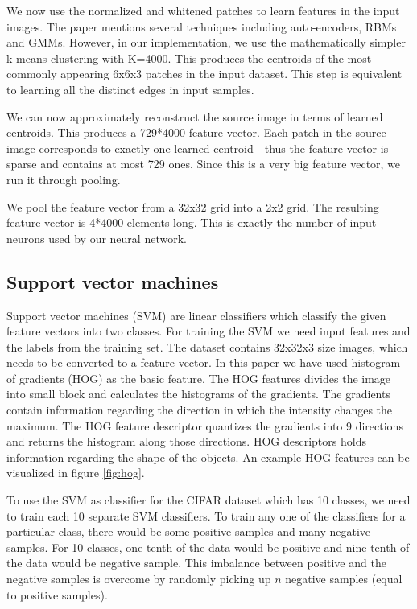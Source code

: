 \documentclass{article} %
\begin{document}
        We now use the normalized and whitened patches to learn features in the input images. The paper \cite{andrew} mentions several techniques including auto-encoders, RBMs and GMMs. However, in our implementation, we use the mathematically simpler k-means clustering with K=4000. This produces the centroids of the most commonly appearing 6x6x3 patches in the input dataset. This step is equivalent to learning all the distinct edges in input samples.

        We can now approximately reconstruct the source image in terms of learned centroids. This produces a 729*4000 feature vector. Each patch in the source image corresponds to exactly one learned centroid - thus the feature vector is sparse and contains at most 729 ones. Since this is a very big feature vector, we run it through pooling.

        We pool the feature vector from a 32x32 grid into a 2x2 grid. The resulting feature vector is 4*4000 elements long. This is exactly the number of input neurons used by our neural network.

\subsection{Support vector machines}
\label{sec:svm}
	Support vector machines (SVM) are linear classifiers which classify the given feature vectors into two classes. For training the SVM we need input features and the labels from the training set. The dataset contains 32x32x3 size images, which needs to be converted to a feature vector. In this paper we have used histogram of gradients (HOG) as the basic feature. The HOG features divides the image into small block and calculates the histograms of the gradients. The gradients contain information regarding the direction in which the intensity changes the maximum. The HOG feature descriptor quantizes the gradients into 9 directions and returns the histogram along those directions. HOG descriptors holds information regarding the shape of the objects. An example HOG features can be visualized in figure \ref{fig:hog}.
	
	To use the SVM as classifier for the CIFAR dataset which has 10 classes, we need to train each 10 separate SVM classifiers. To train any one of the classifiers for a particular class, there would be some positive samples and many negative samples. For 10 classes, one tenth of the data would be positive and nine tenth of the data would be negative sample. This imbalance between positive and the negative samples is overcome by randomly picking up  $n$ negative samples (equal to positive samples).
	
\end{document}
